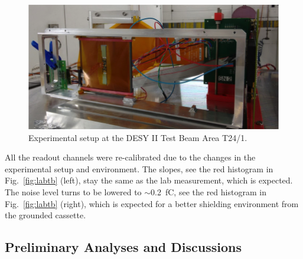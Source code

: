 \documentclass[conference]{IEEEtran}
\begin{document}
\begin{figure}[!ht]%
  \centering
  \includegraphics[width=1.0\linewidth]{pics/tb_2.png}
  \caption{Experimental setup at the DESY II Test Beam Area T24/1.}%
\label{fig:tb2}%
\end{figure}

All the readout channels were re-calibrated due to the changes in the experimental setup and environment.
The slopes, see the red histogram in Fig.~\ref{fig:labtb} (left), stay the same as the lab measurement, which is expected.
The noise level turns to be lowered to $\sim$\SI{0.2}{fC}, see the red histogram in Fig.~\ref{fig:labtb} (right),
which is expected for a better shielding environment from the grounded cassette.

\subsection*{Preliminary Analyses and Discussions}
\end{document}
